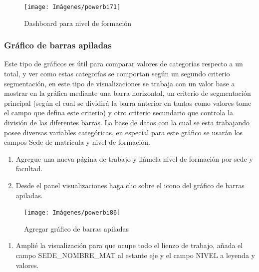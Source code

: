 \documentclass[
]{book}
\providecommand{\tightlist}{%
  \setlength{\itemsep}{0pt}\setlength{\parskip}{0pt}}
\begin{document}
\begin{figure}

{\centering \texttt{[image: Imágenes/powerbi71]} 

}

\caption{Dashboard para nivel de formación}\label{fig:tableronivelformacion-fig}
\end{figure}

\hypertarget{barrasapiladas}{%
\subsubsection{Gráfico de barras apiladas}\label{barrasapiladas}}

Este tipo de gráficos es útil para comparar valores de categorías respecto a un total, y ver como estas categorías se comportan según un segundo criterio segmentación, en este tipo de visualizaciones se trabaja con un valor base a mostrar en la gráfica mediante una barra horizontal, un criterio de segmentación principal (según el cual se dividirá la barra anterior en tantas como valores tome el campo que defina este criterio) y otro criterio secundario que controla la división de las diferentes barras.
La base de datos con la cual se esta trabajando posee diversas variables categóricas, en especial para este gráfico se usarán los campos Sede de matrícula y nivel de formación.

\begin{enumerate}
\def\labelenumi{\arabic{enumi}.}
\item
  Agregue una nueva página de trabajo y llámela nivel de formación por sede y facultad.
\item
  Desde el panel visualizaciones haga clic sobre el icono del gráfico de barras apiladas.
\end{enumerate}

\begin{figure}

{\centering \texttt{[image: Imágenes/powerbi86]} 

}

\caption{Agregar gráfico de barras apiladas}\label{fig:paso2barrasapiladas-fig}
\end{figure}

\begin{enumerate}
\def\labelenumi{\arabic{enumi}.}
\setcounter{enumi}{2}
\tightlist
\item
  Amplié la visualización para que ocupe todo el lienzo de trabajo, añada el campo SEDE\_NOMBRE\_MAT al estante eje y el campo NIVEL a leyenda y valores.
\end{enumerate}
\end{document}
